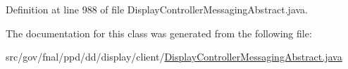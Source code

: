 Definition at line 988 of file Display\-Controller\-Messaging\-Abstract.\-java.



The documentation for this class was generated from the following file\-:\begin{DoxyCompactItemize}
\item 
src/gov/fnal/ppd/dd/display/client/\hyperlink{DisplayControllerMessagingAbstract_8java}{Display\-Controller\-Messaging\-Abstract.\-java}\end{DoxyCompactItemize}
